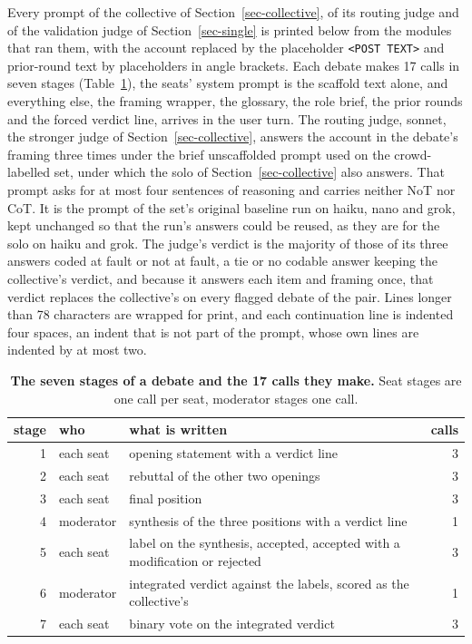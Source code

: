 Every prompt of the collective of Section~\ref{sec-collective}, of its
routing judge and of the validation judge of Section~\ref{sec-single} is
printed below from the modules that ran them, with the account replaced by
the placeholder \texttt{<POST TEXT>} and prior-round text by placeholders in
angle brackets. Each debate makes 17 calls in seven stages
(Table~\ref{tab-app-stages}), the seats' system prompt is the scaffold text
alone, and everything else, the framing wrapper, the glossary, the role
brief, the prior rounds and the forced verdict line, arrives in the user
turn. The routing judge, sonnet, the stronger judge of
Section~\ref{sec-collective}, answers the account in the debate's framing
three times under the brief unscaffolded prompt used on the crowd-labelled
set, under which the solo of Section~\ref{sec-collective} also answers.
That prompt asks for at most four sentences of reasoning and carries neither
NoT nor CoT. It is the prompt of the set's original baseline run on haiku,
nano and grok, kept unchanged so that the run's answers could be reused, as
they are for the solo on haiku and grok. The judge's verdict is the
majority of those of its three answers coded at fault or not at fault, a tie
or no codable answer
keeping the collective's verdict, and because it answers each item and
framing once, that verdict replaces the collective's on every flagged debate
of the pair. Lines longer than 78 characters are wrapped for print, and each
continuation line is indented four spaces, an indent that is not part of the
prompt, whose own lines are indented by at most two.

\begin{table}[t]
\centering
\small
\caption{\textbf{The seven stages of a debate and the 17 calls they make.} Seat
stages are one call per seat, moderator stages one call.}
\label{tab-app-stages}
\begin{tabular}{rllr}
\toprule
stage & who & what is written & calls \\
\midrule
1 & each seat & opening statement with a verdict line & 3 \\
2 & each seat & rebuttal of the other two openings & 3 \\
3 & each seat & final position & 3 \\
4 & moderator & synthesis of the three positions with a verdict line & 1 \\
5 & each seat & label on the synthesis, accepted, accepted with a modification or rejected & 3 \\
6 & moderator & integrated verdict against the labels, scored as the collective's & 1 \\
7 & each seat & binary vote on the integrated verdict & 3 \\
\bottomrule
\end{tabular}
\end{table}

